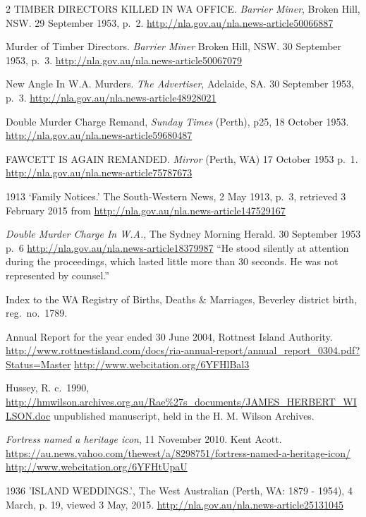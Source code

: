 \begin{thebibliography}{999}
	 2 TIMBER DIRECTORS KILLED IN WA OFFICE. \emph{Barrier Miner}, Broken Hill, NSW. 29 September 1953, p.\ 2.
	 \url{http://nla.gov.au/nla.news-article50066887}

	Murder of Timber Directors. \emph{Barrier Miner} Broken Hill, NSW. 30 September 1953, p.\ 3.
	\url{http://nla.gov.au/nla.news-article50067079}

	New Angle In W.A. Murders. \emph{The Advertiser}, Adelaide, SA. 30 September 1953, p.\ 3.
	\url{http://nla.gov.au/nla.news-article48928021}

	Double Murder Charge Remand, \emph{Sunday Times} (Perth), p25, 18 October 1953.
	\url{http://nla.gov.au/nla.news-article59680487}

	FAWCETT IS AGAIN REMANDED. \emph{Mirror} (Perth, WA) 17 October 1953 p.\ 1.
	\url{http://nla.gov.au/nla.news-article75787673}

	1913 `Family Notices.' The South-Western News, 2 May 1913, p.~3,
	retrieved 3 February 2015 from \url{http://nla.gov.au/nla.news-article147529167}

	\emph{Double Murder Charge In W.A.}, The Sydney Morning Herald. 30 September 1953 p.~6
	\url{http://nla.gov.au/nla.news-article18379987}
	``He stood silently at attention during the proceedings, which lasted little more than 30 seconds.
	He was not represented by counsel.''

	Index to the WA Registry of Births, Deaths \& Marriages, Beverley district birth, reg.~no.~1789.

	Annual Report for the year ended 30 June 2004, Rottnest Island Authority.
	\url{http://www.rottnestisland.com/docs/ria-annual-report/annual_report_0304.pdf?Status=Master}
	\url{http://www.webcitation.org/6YFHlBal3}

	Hussey, R. c.~1990, \url{http://hmwilson.archives.org.au/Rae\%27s_documents/JAMES_HERBERT_WILSON.doc}
	unpublished manuscript, held in the  H. M. Wilson Archives.

	\emph{Fortress named a heritage icon}, 11 November 2010. Kent Acott.
	\url{https://au.news.yahoo.com/thewest/a/8298751/fortress-named-a-heritage-icon/}
	\url{http://www.webcitation.org/6YFHtUpaU}

    1936 'ISLAND WEDDINGS.', The West Australian (Perth, WA: 1879 - 1954), 4 March, p. 19, viewed 3 May, 2015.
    \url{http://nla.gov.au/nla.news-article25131045}


\end{thebibliography}
